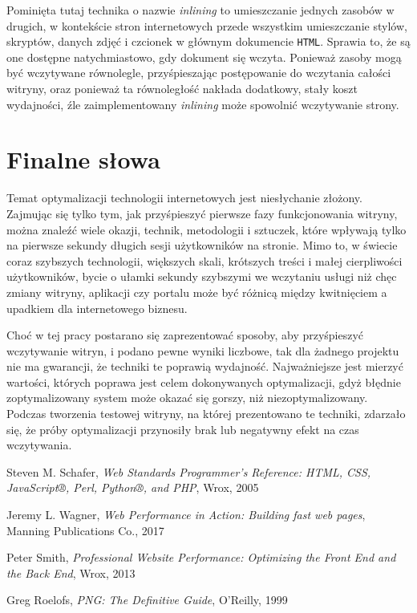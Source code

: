 \documentclass[licencjacka]{pracadypl}
\begin{document}
Pominięta tutaj technika o nazwie \emph{inlining} to umieszczanie jednych zasobów w drugich, w kontekście stron internetowych przede wszystkim umieszczanie stylów, skryptów, danych zdjęć i czcionek w głównym dokumencie \texttt{HTML}. Sprawia to, że są one dostępne natychmiastowo, gdy dokument się wczyta. Ponieważ zasoby mogą być wczytywane równolegle, przyśpieszając postępowanie do wczytania całości witryny, oraz ponieważ ta równoległość nakłada dodatkowy, stały koszt wydajności, źle zaimplementowany \emph{inlining} może spowolnić wczytywanie strony.

\section{Finalne słowa}

Temat optymalizacji technologii internetowych jest niesłychanie złożony. Zajmując się tylko tym, jak przyśpieszyć pierwsze fazy funkcjonowania witryny, można znaleźć wiele okazji, technik, metodologii i sztuczek, które wpływają tylko na pierwsze sekundy długich sesji użytkowników na stronie. Mimo to, w świecie coraz szybszych technologii, większych skali, krótszych treści i małej cierpliwości użytkowników, bycie o ułamki sekundy szybszymi we wczytaniu usługi niż chęc zmiany witryny, aplikacji czy portalu może być różnicą między kwitnięciem a upadkiem dla internetowego biznesu.

Choć w tej pracy postarano się zaprezentować sposoby, aby przyśpieszyć wczytywanie witryn, i podano pewne wyniki liczbowe, tak dla żadnego projektu nie ma gwarancji, że techniki te poprawią wydajność. Najważniejsze jest mierzyć wartości, których poprawa jest celem dokonywanych optymalizacji, gdyż błędnie zoptymalizowany system może okazać się gorszy, niż niezoptymalizowany. Podczas tworzenia testowej witryny, na której prezentowano te techniki, zdarzało się, że próby optymalizacji przynosiły brak lub negatywny efekt na czas wczytywania.

\begin{thebibliography}{7}
%

Steven M. Schafer,
\textit{Web Standards Programmer's Reference: HTML, CSS, JavaScript®, Perl, Python®, and PHP},
Wrox, 2005

Jeremy L. Wagner,
\textit{Web Performance in Action: Building fast web pages},
Manning Publications Co., 2017

Peter Smith,
\textit{Professional Website Performance: Optimizing the Front End and the Back End},
Wrox, 2013

Greg Roelofs,
\textit{PNG: The Definitive Guide},
O'Reilly, 1999
\end{thebibliography}
\end{document}
